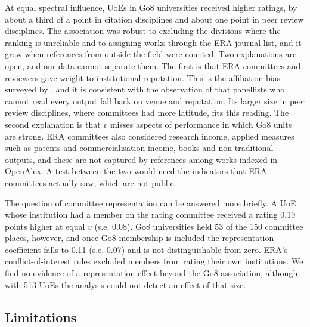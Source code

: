At equal spectral influence, UoEs in Go8 universities received higher ratings, by about a third of a point in citation disciplines and about one point in peer review disciplines. The association was robust to excluding the divisions where the ranking is unreliable and to assigning works through the ERA journal list, and it grew when references from outside the field were counted. Two explanations are open, and our data cannot separate them. The first is that ERA committees and reviewers gave weight to institutional reputation. This is the affiliation bias surveyed by \citet{leeBiasPeerReview2013}, and it is consistent with the observation of \citet{wilsdonMetricTide2015} that panellists who cannot read every output fall back on venue and reputation. Its larger size in peer review disciplines, where committees had more latitude, fits this reading. The second explanation is that $v$ misses aspects of performance in which Go8 units are strong. ERA committees also considered research income, applied measures such as patents and commercialisation income, books and non-traditional outputs, and these are not captured by references among works indexed in OpenAlex. A test between the two would need the indicators that ERA committees actually saw, which are not public.

The question of committee representation can be answered more briefly. A UoE whose institution had a member on the rating committee received a rating 0.19 points higher at equal $v$ (s.e. 0.08). Go8 universities held 53 of the 150 committee places, however, and once Go8 membership is included the representation coefficient falls to 0.11 (s.e. 0.07) and is not distinguishable from zero. ERA's conflict-of-interest rules excluded members from rating their own institutions. We find no evidence of a representation effect beyond the Go8 association, although with 513 UoEs the analysis could not detect an effect of that size.

\subsection{Limitations}

